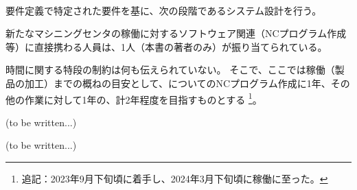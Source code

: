 {\paragraph*{\tpartnextstep}
要件定義で特定された要件を基に、次の段階であるシステム設計を行う。
}









新たなマシニングセンタの稼働に対するソフトウェア関連（NCプログラム作成等）に直接携わる人員は、1人（本書の著者のみ）が振り当てられている。



時間に関する特段の制約は何も伝えられていない。
そこで、ここでは稼働（製品の加工）までの概ねの目安として、\Dimple についてのNCプログラム作成に1年、その他の作業に対して1年の、計2年程度を目指すものとする
\footnote{追記：2023年9月下旬頃に着手し、2024年3月下旬頃に稼働に至った。}。




(to be written...)







(to be written...)

\begin{appendices}
\end{appendices}

